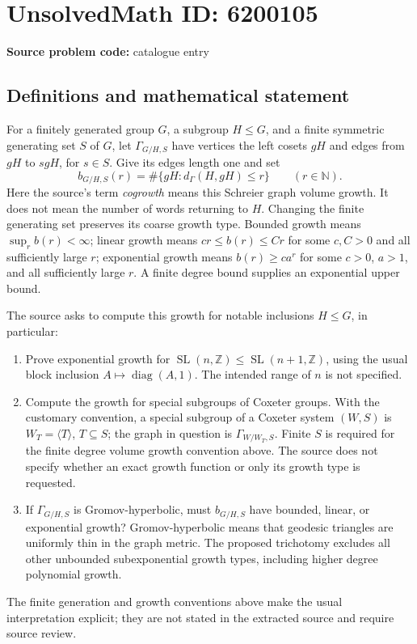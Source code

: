 \documentclass[11pt]{article}
\newcommand{\N}{\mathbb{N}}
\newcommand{\Z}{\mathbb{Z}}
\begin{document}
\section*{UnsolvedMath ID: 6200105}
\textbf{Source problem code:} catalogue entry
\subsection{Definitions and mathematical statement}
For a finitely generated group \(G\), a subgroup \(H\leq G\), and a finite symmetric generating set \(S\) of \(G\), let \(\Gamma_{G/H,S}\) have vertices the left cosets \(gH\) and edges from \(gH\) to \(sgH\), for \(s\in S\). Give its edges length one and set
\[
 b_{G/H,S}(r)=\#\{gH:d_{\Gamma}(H,gH)\leq r\}\qquad(r\in\N).
\]
Here the source's term \emph{cogrowth} means this Schreier graph volume growth. It does not mean the number of words returning to \(H\). Changing the finite generating set preserves its coarse growth type. Bounded growth means \(\sup_r b(r)<\infty\); linear growth means \(cr\leq b(r)\leq Cr\) for some \(c,C>0\) and all sufficiently large \(r\); exponential growth means \(b(r)\geq ca^r\) for some \(c>0\), \(a>1\), and all sufficiently large \(r\). A finite degree bound supplies an exponential upper bound.

The source asks to compute this growth for notable inclusions \(H\leq G\), in particular:
\begin{enumerate}
\item Prove exponential growth for \(\operatorname{SL}(n,\Z)\leq\operatorname{SL}(n+1,\Z)\), using the usual block inclusion \(A\mapsto\operatorname{diag}(A,1)\). The intended range of \(n\) is not specified.
\item Compute the growth for special subgroups of Coxeter groups. With the customary convention, a special subgroup of a Coxeter system \((W,S)\) is \(W_T=\langle T\rangle\), \(T\subseteq S\); the graph in question is \(\Gamma_{W/W_T,S}\). Finite \(S\) is required for the finite degree volume growth convention above. The source does not specify whether an exact growth function or only its growth type is requested.
\item If \(\Gamma_{G/H,S}\) is Gromov-hyperbolic, must \(b_{G/H,S}\) have bounded, linear, or exponential growth? Gromov-hyperbolic means that geodesic triangles are uniformly thin in the graph metric. The proposed trichotomy excludes all other unbounded subexponential growth types, including higher degree polynomial growth.
\end{enumerate}
The finite generation and growth conventions above make the usual interpretation explicit; they are not stated in the extracted source and require source review.
\end{document}

